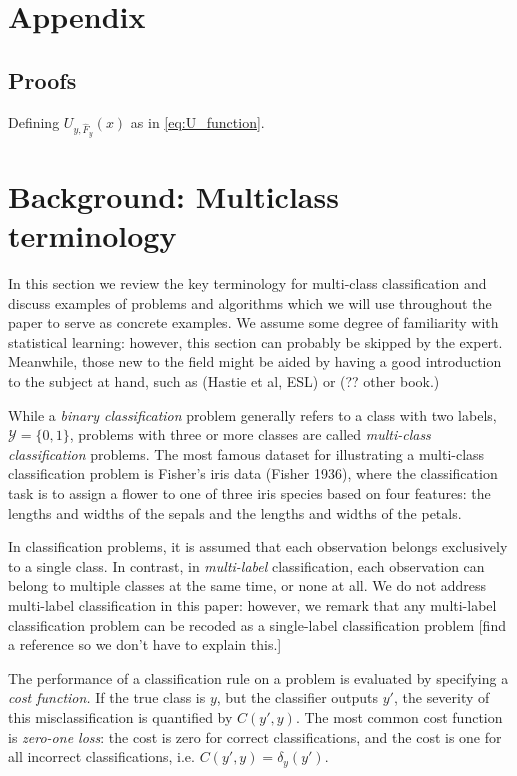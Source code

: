 \documentclass[12pt]{article}
\begin{document}
\appendix
\section{Appendix}
\subsection{Proofs}

\begin{lemma}\label{lemma:U_function}
Defining $U_{y,\hat{F}_y}(x)$ as in \eqref{eq:U_function}.
\end{lemma}

\section{Background: Multiclass terminology}

In this section we review the key terminology for multi-class
classification and discuss examples of problems and algorithms which
we will use throughout the paper to serve as concrete examples.  We
assume some degree of familiarity with statistical learning: however,
this section can probably be skipped by the expert.  Meanwhile, those
new to the field might be aided by having a good introduction to the
subject at hand, such as (Hastie et al, ESL) or (?? other book.)

While a \emph{binary classification} problem generally refers to a
class with two labels, $\mathcal{Y} = \{0, 1\}$, problems with three
or more classes are called \emph{multi-class classification} problems.
The most famous dataset for illustrating a multi-class classification
problem is Fisher's iris data (Fisher 1936), where the classification
task is to assign a flower to one of three iris species based on four
features: the lengths and widths of the sepals and the lengths and
widths of the petals.

In classification problems, it is assumed that each observation
belongs exclusively to a single class.  In contrast,
in \emph{multi-label} classification, each observation can belong to
multiple classes at the same time, or none at all.  We do not address
multi-label classification in this paper: however, we remark that any
multi-label classification problem can be recoded as a single-label
classification problem [find a reference so we don't have to explain
this.]

The performance of a classification rule on a problem is evaluated by
specifying a \emph{cost function.}  If the true class is $y$, but the
classifier outputs $y'$, the severity of this misclassification is
quantified by $C(y', y)$.  The most common cost function
is \emph{zero-one loss}: the cost is zero for correct classifications,
and the cost is one for all incorrect classifications, i.e. $C(y', y)
= \delta_{y}(y').$
\end{document}
